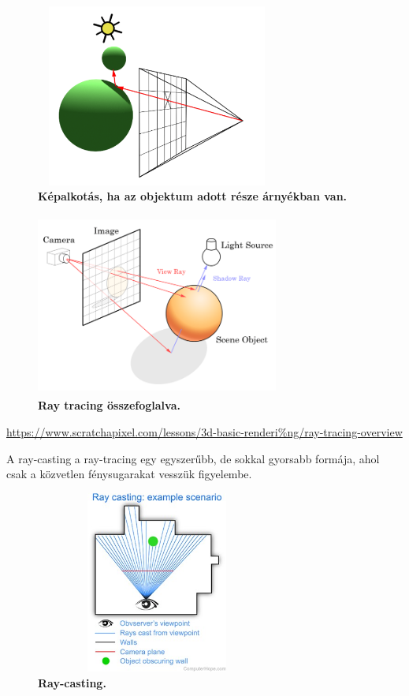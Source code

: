 \documentclass[12pt]{article}
\theoremstyle{plain}
\begin{document}
\begin{figure}[H]
   \centering
   \includegraphics[width=8cm, height=6cm]{media/shadow2.PNG}
   \caption{\textbf{Képalkotás, ha az objektum adott része árnyékban van.}}
   \label{fig:GeneralDiagram}
\end{figure}

\begin{figure}[H]
   \centering
   \includegraphics[width=8cm, height=6cm]{media/Ray_trace_diagram.png}
   \caption{\textbf{Ray tracing összefoglalva.}}
   \label{fig:GeneralDiagram}
\end{figure}

\url{https://www.scratchapixel.com/lessons/3d-basic-renderi%ng/ray-tracing-overview}

A ray-casting a ray-tracing egy egyszerűbb, de sokkal gyorsabb formája, ahol csak a közvetlen fénysugarakat vesszük figyelembe.

\begin{figure}[H]
   \centering
   \includegraphics[width=8cm, height=6cm]{media/ray-casting-diagram.jpg}
   \caption{\textbf{Ray-casting.}}
   \label{fig:GeneralDiagram}
\end{figure}
\end{document}
